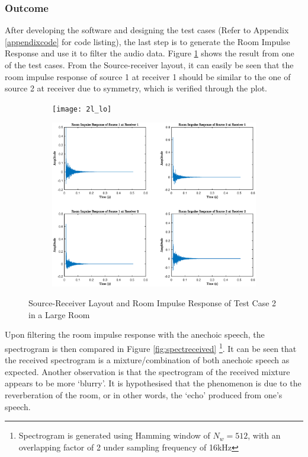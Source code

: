 \documentclass[a4paper,twoside,12pt,hidelinks]{article}
\begin{document}
\subsubsection{Outcome}
After developing the software and designing the test cases (Refer to Appendix \ref{appendixcode} for code listing), the last step is to generate the Room Impulse Response and use it to filter the audio data. Figure \ref{fig:outcome} shows the result from one of the test cases. From the Source-receiver layout, it can easily be seen that the room impulse response of source 1 at receiver 1 should be similar to the one of source 2 at receiver due to symmetry, which is verified through the plot. 
\begin{figure}[H]
\centering
\begin{subfigure}[H]{0.44\textwidth}
\texttt{[image: 2l\_lo]}
\end{subfigure}
\begin{subfigure}[H]{0.55\textwidth}
\includegraphics[width=\textwidth]{2l_ir}
\end{subfigure}
\caption{Source-Receiver Layout and Room Impulse Response of Test Case 2 in a Large Room}
\label{fig:outcome}
\end{figure}

Upon filtering the room impulse response with the anechoic speech, the spectrogram is then compared in Figure \ref{fig:spectreceived} \footnote{Spectrogram is generated using Hamming window of $N_w = 512$, with an overlapping factor of 2 under sampling frequency of 16kHz}. It can be seen that the received spectrogram is a mixture/combination of both anechoic speech as expected. Another observation is that the spectrogram of the received mixture appears to be more `blurry'. It is hypothesised that the phenomenon is due to the reverberation of the room, or in other words, the `echo' produced from one's speech.
\end{document}
